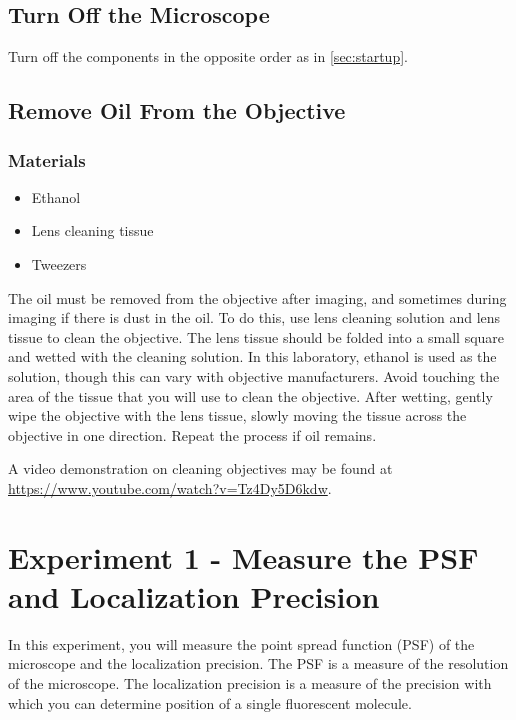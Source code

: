 \documentclass[10pt,a4paper,oneside]{book}
\begin{document}
\subsection{Turn Off the Microscope}

Turn off the components in the opposite order as in \autoref{sec:startup}.

\subsection{Remove Oil From the Objective}\label{sec:remove-oil}

\subsubsection{Materials}

\begin{itemize}
    \item{Ethanol}
    \item{Lens cleaning tissue}
    \item{Tweezers}
\end{itemize}

The oil must be removed from the objective after imaging, and sometimes during imaging if there is dust in the oil. To do this, use lens cleaning solution and lens tissue to clean the objective. The lens tissue should be folded into a small square and wetted with the cleaning solution. In this laboratory, ethanol is used as the solution, though this can vary with objective manufacturers. Avoid touching the area of the tissue that you will use to clean the objective. After wetting, gently wipe the objective with the lens tissue, slowly moving the tissue across the objective in one direction. Repeat the process if oil remains.

A video demonstration on cleaning objectives may be found at \url{https://www.youtube.com/watch?v=Tz4Dy5D6kdw}.

\section{Experiment 1 - Measure the PSF and Localization Precision}\label{sec:exp1}

In this experiment, you will measure the point spread function (PSF) of the microscope and the localization precision. The PSF is a measure of the resolution of the microscope. The localization precision is a measure of the precision with which you can determine position of a single fluorescent molecule.
\end{document}
